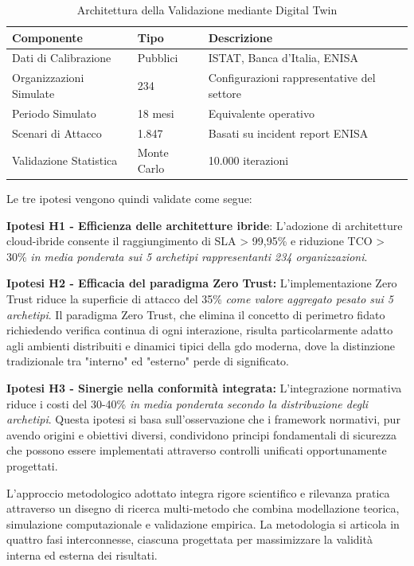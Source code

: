 \begin{table}[h]
\centering
\caption{Architettura della Validazione mediante Digital Twin}
\begin{tabular}{|l|l|p{6cm}|}
\hline
\textbf{Componente} & \textbf{Tipo} & \textbf{Descrizione} \\
\hline
Dati di Calibrazione & Pubblici & ISTAT, Banca d'Italia, ENISA \\
Organizzazioni Simulate & 234 & Configurazioni rappresentative del settore \\
Periodo Simulato & 18 mesi & Equivalente operativo \\
Scenari di Attacco & 1.847 & Basati su incident report ENISA \\
Validazione Statistica & Monte Carlo & 10.000 iterazioni \\
\hline
\end{tabular}
\end{table}

Le tre ipotesi vengono quindi validate come segue:

\textbf{Ipotesi H1 - Efficienza delle architetture ibride}:  L'adozione di architetture cloud-ibride consente 
il raggiungimento di SLA > 99,95\% e riduzione TCO > 30\% \textit{in media ponderata sui 5 archetipi rappresentanti 234 organizzazioni}.


\textbf{Ipotesi H2 - Efficacia del paradigma Zero Trust:} L'implementazione Zero Trust riduce la superficie 
di attacco del 35\% \textit{come valore aggregato pesato sui 5 archetipi}. Il paradigma Zero Trust, che elimina il concetto di perimetro fidato richiedendo verifica continua di ogni interazione, risulta particolarmente adatto agli ambienti distribuiti e dinamici tipici della \gls{gdo} moderna, dove la distinzione tradizionale tra "interno" ed "esterno" perde di significato.

\textbf{Ipotesi H3 - Sinergie nella conformità integrata:}  L'integrazione normativa riduce i costi del 30-40\% 
\textit{in media ponderata secondo la distribuzione degli archetipi}. Questa ipotesi si basa sull'osservazione che i framework normativi, pur avendo origini e obiettivi diversi, condividono principi fondamentali di sicurezza che possono essere implementati attraverso controlli unificati opportunamente progettati.

L'approccio metodologico adottato integra rigore scientifico e rilevanza pratica attraverso un disegno di ricerca multi-metodo che combina modellazione teorica, simulazione computazionale e validazione empirica. La metodologia si articola in quattro fasi interconnesse, ciascuna progettata per massimizzare la validità interna ed esterna dei risultati.

